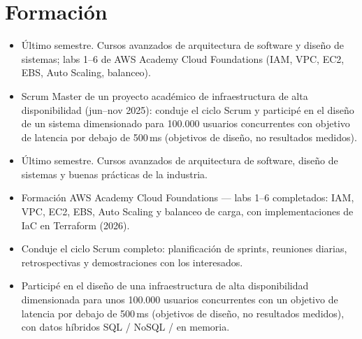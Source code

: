 \fi

\section{Formación}

\begin{itemize}
  \ifonepage
  \item Último semestre. Cursos avanzados de arquitectura de software y diseño de sistemas; labs
        1--6 de AWS Academy Cloud Foundations (IAM, VPC, EC2, EBS, Auto Scaling, balanceo).
  \item Scrum Master de un proyecto académico de infraestructura de alta disponibilidad (jun--nov
        2025): conduje el ciclo Scrum y participé en el diseño de un sistema dimensionado para
        100.000 usuarios concurrentes con objetivo de latencia por debajo de 500\,ms (objetivos de diseño, no
        resultados medidos).
  \else
  \item Último semestre. Cursos avanzados de arquitectura de software, diseño de sistemas y buenas
        prácticas de la industria.
  \item Formación AWS Academy Cloud Foundations --- labs 1--6 completados: IAM, VPC, EC2, EBS,
        Auto Scaling y balanceo de carga, con implementaciones de IaC en Terraform (2026).
  \fi
\end{itemize}
\ifonepage\else
{}
\begin{itemize}
  \item Conduje el ciclo Scrum completo: planificación de sprints, reuniones diarias, retrospectivas
        y demostraciones con los interesados.
  \item Participé en el diseño de una infraestructura de alta disponibilidad dimensionada para unos
        100.000 usuarios concurrentes con un objetivo de latencia por debajo de 500\,ms (objetivos de
        diseño, no resultados medidos), con datos híbridos SQL / NoSQL / en memoria.
\end{itemize}
\fi

